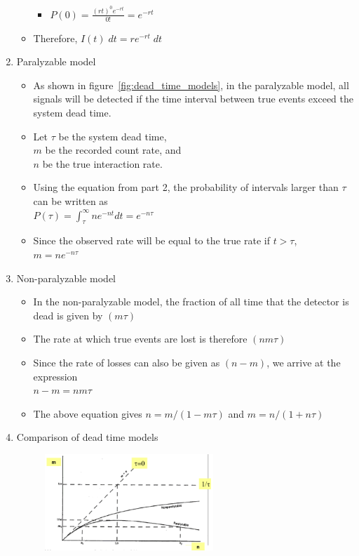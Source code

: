 \begin{enumerate}
\begin{itemize}
        \begin{itemize}
            \item[] $P(0)=\frac{(rt)^0e^{-rt}}{0!}=e^{-rt}$
        \end{itemize}
        \item Therefore, $I(t)\;dt=re^{-rt}\;dt$
    \end{itemize}
    \item Paralyzable model
    \begin{itemize}
        \item As shown in figure~\ref{fig:dead_time_models}, in the paralyzable model, all signals will be detected if the time interval between true events exceed the system dead time.
        \item Let $\tau$ be the system dead time,\\
        $m$ be the recorded count rate, and\\
        $n$ be the true interaction rate.
        \item Using the equation from part 2, the probability of intervals larger than $\tau$ can be written as\\
        $P(\tau)=\int_\tau^\infty ne^{-nt}dt=e^{-n\tau}$
        \item Since the observed rate will be equal to the true rate if $t>\tau$, \\
        $m=ne^{-n\tau}$
    \end{itemize}
    \item Non-paralyzable model 
    \begin{itemize}
        \item In the non-paralyzable model, the fraction of all time that the detector is dead is given by $(m\tau)$
        \item The rate at which true events are lost is therefore $(nm\tau)$
        \item Since the rate of losses can also be given as $(n-m)$, we arrive at the expression\\
        $n-m=nm\tau$
        \item The above equation gives $n=m/(1-m\tau)$ and $m=n/(1+n\tau)$
    \end{itemize}
    \item Comparison of dead time models
    \begin{figure}[ht]
        \centering
        \includegraphics[width=0.6\textwidth]{images/deadtimemodel_comparison.png}

\end{figure}
\end{enumerate}
